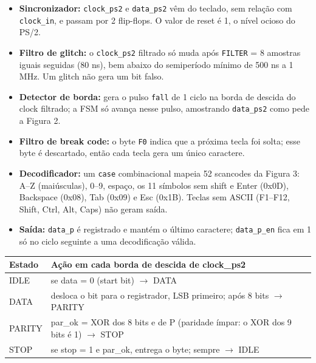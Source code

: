 \documentclass[a4paper,11pt]{article}
\begin{document}
\begin{itemize}
    \item \textbf{Sincronizador:} \texttt{clock\_ps2} e \texttt{data\_ps2} vêm do teclado, sem relação com \texttt{clock\_in}, e passam por 2 flip-flops. O valor de reset é 1, o nível ocioso do PS/2.
    \item \textbf{Filtro de glitch:} o \texttt{clock\_ps2} filtrado só muda após \texttt{FILTER} = 8 amostras iguais seguidas (80 ns), bem abaixo do semiperíodo mínimo de 500 ns a 1 MHz. Um glitch não gera um bit falso.
    \item \textbf{Detector de borda:} gera o pulso \texttt{fall} de 1 ciclo na borda de descida do clock filtrado; a FSM só avança nesse pulso, amostrando \texttt{data\_ps2} como pede a Figura 2.
    \item \textbf{Filtro de break code:} o byte \texttt{F0} indica que a próxima tecla foi solta; esse byte é descartado, então cada tecla gera um único caractere.
    \item \textbf{Decodificador:} um \texttt{case} combinacional mapeia 52 scancodes da Figura 3: A--Z (maiúsculas), 0--9, espaço, os 11 símbolos sem shift e Enter (0x0D), Backspace (0x08), Tab (0x09) e Esc (0x1B). Teclas sem ASCII (F1--F12, Shift, Ctrl, Alt, Caps) não geram saída.
    \item \textbf{Saída:} \texttt{data\_p} é registrado e mantém o último caractere; \texttt{data\_p\_en} fica em 1 só no ciclo seguinte a uma decodificação válida.
\end{itemize}

\begin{center}
\small
\begin{tabular}{|>{\raggedright\arraybackslash}p{}|>{\raggedright\arraybackslash}p{}|}
\hline
\textbf{Estado} & \textbf{Ação em cada borda de descida de clock\_ps2} \\
\hline
IDLE & se data = 0 (start bit) $\rightarrow$ DATA \\
\hline
DATA & desloca o bit para o registrador, LSB primeiro; após 8 bits $\rightarrow$ PARITY \\
\hline
PARITY & par\_ok = XOR dos 8 bits e de P (paridade ímpar: o XOR dos 9 bits é 1) $\rightarrow$ STOP \\
\hline
STOP & se stop = 1 e par\_ok, entrega o byte; sempre $\rightarrow$ IDLE \\
\hline
\end{tabular}
\end{center}
\end{document}
